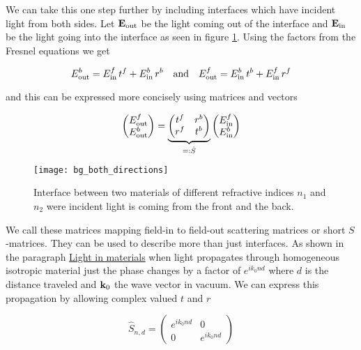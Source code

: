 We can take this one step further by including interfaces which have incident light from both sides. Let $\vb E_{\mathrm{out}}$ be the light coming out of the interface and $\vb E_{\mathrm{in}}$ be the light going into the interface as seen in figure \ref{fig:bg:both}. Using the factors from the Fresnel equations we get

\begin{equation}
    E^b_\s{out} = E^f_\s{in} \, t^f + E^b_\s{in} \, r^b
    \qq{and}
    E^f_\s{out} = E^b_\s{in} \, t^b + E^f_\s{in} \, r^f
\end{equation}
\vspace{0.5mm}

and this can be expressed more concisely using matrices and vectors

\begin{equation}
\begin{pmatrix}
    E^f_{\mathrm{out}} \\
    E^b_{\mathrm{out}}
\end{pmatrix} =
\underbrace{
\begin{pmatrix}
    t^f & r^b \\
    r^f & t^b
\end{pmatrix}
}_{
 =: \hat{S}
}
\begin{pmatrix}
    E^f_{\mathrm{in}} \\
    E^b_{\mathrm{in}}
\end{pmatrix}
\end{equation}

\begin{figure}[H]
    \centering
    \texttt{[image: bg\_both\_directions]}
    \caption{Interface between two materials of different refractive indices $n_1$ and $n_2$ were incident light is coming from the front and the back.}
    \label{fig:bg:both}
\end{figure}

We call these matrices mapping field-in to field-out scattering matrices or short $S$-matrices. They can be used to describe more than just interfaces. As shown in the paragraph \hyperref[par:light_in_materials]{Light in materials} when light propagates through homogeneous isotropic material just the phase changes by a factor of $e^{i k_0 n d}$ where $d$ is the distance traveled and $\vb k_0$ the wave vector in vacuum. We can express this propagation by allowing complex valued $t$ and $r$

\begin{equation}
    \hat S_{n, d} =
    \begin{pmatrix}
        e^{i k_0 n d} & 0 \\
        0 & e^{i k_0 n d}
    \end{pmatrix}
\end{equation}

